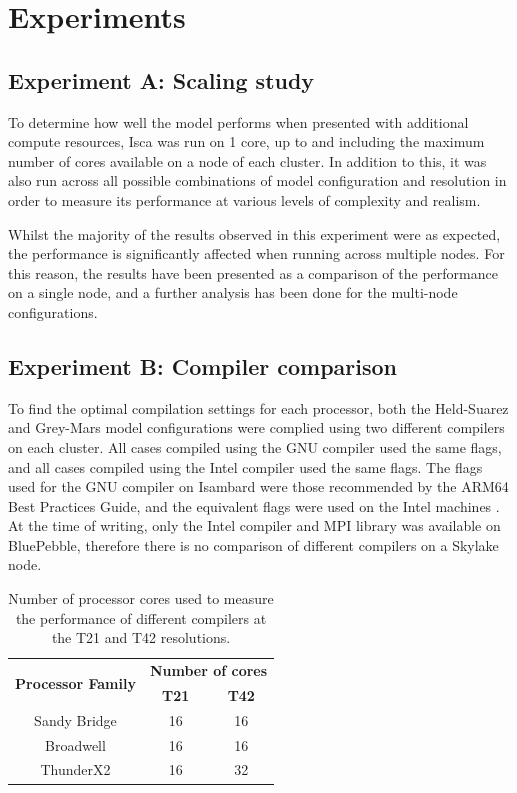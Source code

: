 \documentclass[a4paper,11pt]{report}
\begin{document}
\section{Experiments}
\label{sec:experiment-methods}
\subsection{Experiment A: Scaling study}
To determine how well the model performs when presented with additional compute resources, Isca was run on 1 core, up to and including the maximum number of cores available on a node of each cluster. In addition to this, it was also run across all possible combinations of model configuration and resolution in order to measure its performance at various levels of complexity and realism.  
\par
Whilst the majority of the results observed in this experiment were as expected, the performance is significantly affected when running across multiple nodes. For this reason, the results have been presented as a comparison of the performance on a single node, and a further analysis has been done for the multi-node configurations.

\subsection{Experiment B: Compiler comparison}
To find the optimal compilation settings for each processor, both the Held-Suarez and Grey-Mars model configurations were complied using two different compilers on each cluster. All cases compiled using the GNU compiler used the same flags, and all cases compiled using the Intel compiler used the same flags. The flags used for the GNU compiler on Isambard were those recommended by the ARM64 Best Practices Guide, and the equivalent flags were used on the Intel machines \cite{arm2019practices}. At the time of writing, only the Intel compiler and MPI library was available on BluePebble, therefore there is no comparison of different compilers on a Skylake node. 
\par

\begin{table}[htp]
\caption{Number of processor cores used to measure the performance of different compilers at the T21 and T42 resolutions.}
\begin{center}
\begin{tabular}{c c c}
\toprule
\multirow{2}{*}{\textbf{Processor Family}}	&	\multicolumn{2}{c}{\textbf{Number of cores}}	\\
							 		\cmidrule(lr){2-3}
								& 	\textbf{T21} 	&	\textbf{T42}			\\
\midrule
Sandy Bridge						&	16			&	16					\\
Broadwell							&	16			&	16					\\
ThunderX2						&	16			&	32					\\
\bottomrule
\end{tabular}
\end{center}
\label{tbl:-compiler-cores}
\end{table}%
\end{document}
